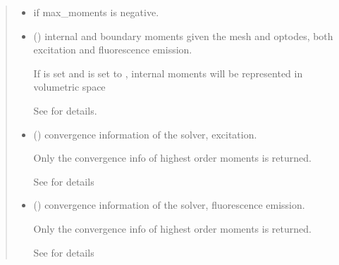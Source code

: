 \documentclass[letterpaper,10pt,english]{sphinxmanual}
\begin{document}
\begin{fulllineitems}
\begin{quote}
\begin{description}
\begin{itemize}
\item {} 
\sphinxAtStartPar
{} \textendash{} if max\_moments is negative.

\end{itemize}

\sphinxAtStartPar
\begin{itemize}
\item {} 
\sphinxAtStartPar
{} () \textendash{} internal and boundary moments given the mesh and optodes, both excitation and fluorescence emission.

\sphinxAtStartPar
If  is set and  is set to , internal moments will be represented in volumetric space

\sphinxAtStartPar
See {\hyperref[\detokenize{_autosummary/nirfasterff.base.data.flTRMomentsdata:nirfasterff.base.data.flTRMomentsdata}]{}} for details.

\item {} 
\sphinxAtStartPar
{} () \textendash{} convergence information of the solver, excitation.

\sphinxAtStartPar
Only the convergence info of highest order moments is returned.

\sphinxAtStartPar
See {\hyperref[\detokenize{_autosummary/nirfasterff.utils.ConvergenceInfo:nirfasterff.utils.ConvergenceInfo}]{}} for details

\item {} 
\sphinxAtStartPar
{} () \textendash{} convergence information of the solver, fluorescence emission.

\sphinxAtStartPar
Only the convergence info of highest order moments is returned.

\sphinxAtStartPar
See {\hyperref[\detokenize{_autosummary/nirfasterff.utils.ConvergenceInfo:nirfasterff.utils.ConvergenceInfo}]{}} for details

\end{itemize}


\end{description}\end{quote}



\end{fulllineitems}
\end{document}

